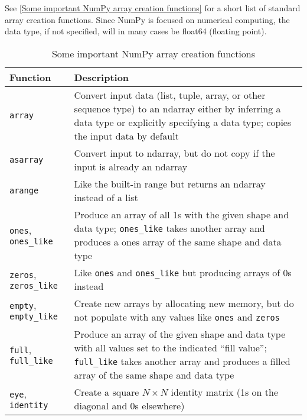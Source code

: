 See \autoref{Some important NumPy array creation functions} for a short list of standard array creation functions. Since NumPy is focused on numerical computing, the data type, if not specified, will in many cases be float64 (floating point).

\begin{table}
    \caption{Some important NumPy array creation functions}
    \label{Some important NumPy array creation functions}
    \begin{tabularx}{\textwidth}{lX}
        \hline
        Function                        & Description                                                                                                                                                                                          \\
        \hline
        \verb|array|                    & Convert input data (list, tuple, array, or other sequence type) to an ndarray either by inferring a data
        type or explicitly specifying a data type; copies the input data by default                                                                                                                                                            \\
        \verb|asarray|                  & Convert input to ndarray, but do not copy if the input is already an ndarray                                                                                                                         \\
        \verb|arange|                   & Like the built-in range but returns an ndarray instead of a list                                                                                                                                     \\
        \verb|ones|, \verb|ones_like|   & Produce an array of all 1s with the given shape and data type; \verb|ones_like| takes another array and produces a ones array of the same shape and data type                                        \\
        \verb|zeros|, \verb|zeros_like| & Like \verb|ones| and \verb|ones_like| but producing arrays of 0s instead                                                                                                                             \\
        \verb|empty|, \verb|empty_like| & Create new arrays by allocating new memory, but do not populate with any values like \verb|ones| and \verb|zeros|                                                                                    \\
        \verb|full|, \verb|full_like|   & Produce an array of the given shape and data type with all values set to the indicated “fill value”; \verb|full_like| takes another array and produces a filled array of the same shape and data type \\
        \verb|eye|, \verb|identity|     & Create a square $N \times N$ identity matrix (1s on the diagonal and 0s elsewhere)                                                                                                                   \\
        \hline
    \end{tabularx}
\end{table}

